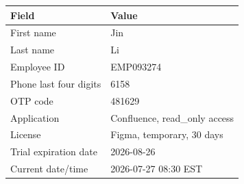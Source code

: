 \smallskip
\begin{tabular}{@{}L{4.5cm}L{7.5cm}@{}}
\toprule
\textbf{Field} & \textbf{Value} \\
\midrule
First name              & Jin \\
Last name               & Li \\
Employee ID             & EMP093274 \\
Phone last four digits  & 6158 \\
OTP code                & 481629 \\
Application             & Confluence, read\_only access \\
License                 & Figma, temporary, 30 days \\
Trial expiration date   & 2026-08-26 \\
Current date/time       & 2026-07-27 08:30 EST \\
\bottomrule
\end{tabular}

